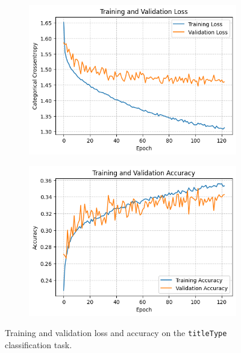 \begin{figure}[H]
    \centering
    \begin{subfigure}[b]{0.49\textwidth}
        \centering
        \includegraphics[width=\textwidth]{plotsss/loss_titletype.png}
        \label{fig:loss_nn_titletype}
    \end{subfigure}
    \hfill
    \begin{subfigure}[b]{0.49\textwidth}
        \centering
        \includegraphics[width=\textwidth]{plotsss/accuracy_titletype.png}
        \label{fig:accuracy_nn_titletype}
    \end{subfigure}
    \caption{Training and validation loss and accuracy on the \texttt{titleType} classification task.}
    \label{fig:nn_performance_titletype}
\end{figure}

